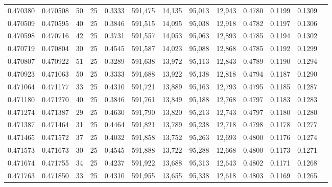 \begin{tabular}{rrrrrrrrrrrrr}
0.470380 & 0.470508 &    50 &  25 &                                     0.3333 & 591,475 &  14,135 &  95,013 &  12,943 & 0.4780 & 0.1199 & 0.1309 \\
0.470509 & 0.470595 &    40 &  25 &                                     0.3846 & 591,515 &  14,095 &  95,038 &  12,918 & 0.4782 & 0.1197 & 0.1306 \\
0.470598 & 0.470716 &    42 &  25 &                                     0.3731 & 591,557 &  14,053 &  95,063 &  12,893 & 0.4785 & 0.1194 & 0.1302 \\
0.470719 & 0.470804 &    30 &  25 &                                     0.4545 & 591,587 &  14,023 &  95,088 &  12,868 & 0.4785 & 0.1192 & 0.1299 \\
0.470807 & 0.470922 &    51 &  25 &                                     0.3289 & 591,638 &  13,972 &  95,113 &  12,843 & 0.4789 & 0.1190 & 0.1294 \\
0.470923 & 0.471063 &    50 &  25 &                                     0.3333 & 591,688 &  13,922 &  95,138 &  12,818 & 0.4794 & 0.1187 & 0.1290 \\
0.471064 & 0.471177 &    33 &  25 &                                     0.4310 & 591,721 &  13,889 &  95,163 &  12,793 & 0.4795 & 0.1185 & 0.1287 \\
0.471180 & 0.471270 &    40 &  25 &                                     0.3846 & 591,761 &  13,849 &  95,188 &  12,768 & 0.4797 & 0.1183 & 0.1283 \\
0.471274 & 0.471387 &    29 &  25 &                                     0.4630 & 591,790 &  13,820 &  95,213 &  12,743 & 0.4797 & 0.1180 & 0.1280 \\
0.471387 & 0.471464 &    31 &  25 &                                     0.4464 & 591,821 &  13,789 &  95,238 &  12,718 & 0.4798 & 0.1178 & 0.1277 \\
0.471465 & 0.471572 &    37 &  25 &                                     0.4032 & 591,858 &  13,752 &  95,263 &  12,693 & 0.4800 & 0.1176 & 0.1274 \\
0.471573 & 0.471673 &    30 &  25 &                                     0.4545 & 591,888 &  13,722 &  95,288 &  12,668 & 0.4800 & 0.1173 & 0.1271 \\
0.471674 & 0.471755 &    34 &  25 &                                     0.4237 & 591,922 &  13,688 &  95,313 &  12,643 & 0.4802 & 0.1171 & 0.1268 \\
0.471763 & 0.471850 &    33 &  25 &                                     0.4310 & 591,955 &  13,655 &  95,338 &  12,618 & 0.4803 & 0.1169 & 0.1265 \\

\end{tabular}

